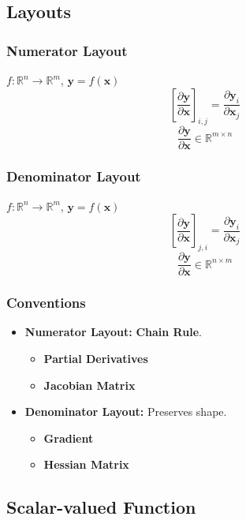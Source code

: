 \documentclass{article}
\begin{document}
\subsection{Layouts}

\subsubsection{Numerator Layout}

$f: \mathbb{R}^n \to \mathbb{R}^m$, $\mathbf{y} = f(\mathbf{x})$
\[
    \left[\frac{\partial \mathbf{y}}{\partial \mathbf{x}}\right]_{i,j} = \frac{\partial \mathbf{y}_{i}}{\partial \mathbf{x}_{j}}
\]
\[
    \frac{\partial \mathbf{y}}{\partial \mathbf{x}} \in \mathbb{R}^{m\times n}
\]

\subsubsection{Denominator Layout}

$f: \mathbb{R}^n \to \mathbb{R}^m$, $\mathbf{y} = f(\mathbf{x})$
\[
    \left[\frac{\partial \mathbf{y}}{\partial \mathbf{x}}\right]_{j,i} = \frac{\partial \mathbf{y}_{i}}{\partial \mathbf{x}_{j}}
\]
\[
    \frac{\partial \mathbf{y}}{\partial \mathbf{x}} \in \mathbb{R}^{n\times m}
\]

\subsubsection{Conventions}

\begin{itemize}
    \item \textbf{Numerator Layout:} \textbf{Chain Rule}.
    \begin{itemize}
        \item \textbf{Partial Derivatives}
        \item \textbf{Jacobian Matrix}
    \end{itemize}

    \item \textbf{Denominator Layout:} Preserves shape.
    \begin{itemize}
        \item \textbf{Gradient}
        \item \textbf{Hessian Matrix}
    \end{itemize}
\end{itemize}

\subsection{Scalar-valued Function}
\end{document}

